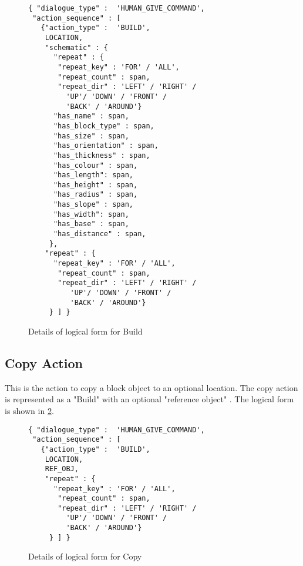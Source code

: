 \begin{figure}[ht]
    \centering
    \fontsize{8pt}{8pt}\selectfont
    \begin{verbatim}
{ "dialogue_type" :  'HUMAN_GIVE_COMMAND',
 "action_sequence" : [
   {"action_type" :  'BUILD',
    LOCATION,
    "schematic" : {
      "repeat" : {
       "repeat_key" : 'FOR' / 'ALL',
       "repeat_count" : span,
       "repeat_dir" : 'LEFT' / 'RIGHT' / 
         'UP'/ 'DOWN' / 'FRONT' / 
         'BACK' / 'AROUND'}
      "has_name" : span,
      "has_block_type" : span,
      "has_size" : span,
      "has_orientation" : span,
      "has_thickness" : span,
      "has_colour" : span,
      "has_length": span,
      "has_height" : span,
      "has_radius" : span,
      "has_slope" : span,
      "has_width": span,
      "has_base" : span,
      "has_distance" : span,
     },
    "repeat" : {
      "repeat_key" : 'FOR' / 'ALL',
       "repeat_count" : span,
       "repeat_dir" : 'LEFT' / 'RIGHT' /
          'UP'/ 'DOWN' / 'FRONT' / 
          'BACK' / 'AROUND'}
     } ] }
    \end{verbatim}
    \vspace{-20pt}
    \caption{Details of logical form for Build}
    \vspace{-8pt}
    \label{fig:build_dict}
\end{figure}


\subsection{Copy Action}
This is the action to copy a block object to an optional location. The copy action is represented as a "Build" with an optional "reference object" . The logical form  is shown in \ref{fig:copy_dict}.


\begin{figure}[ht]
    \centering
    \fontsize{8pt}{8pt}\selectfont
    \begin{verbatim}
{ "dialogue_type" :  'HUMAN_GIVE_COMMAND',
 "action_sequence" : [
   {"action_type" :  'BUILD',
    LOCATION,
    REF_OBJ,
    "repeat" : {
      "repeat_key" : 'FOR' / 'ALL',
       "repeat_count" : span,
       "repeat_dir" : 'LEFT' / 'RIGHT' / 
         'UP'/ 'DOWN' / 'FRONT' / 
         'BACK' / 'AROUND'}
     } ] }
    \end{verbatim}
    \vspace{-20pt}
    \caption{Details of logical form for Copy}
    \vspace{-8pt}
    \label{fig:copy_dict}
\end{figure}


